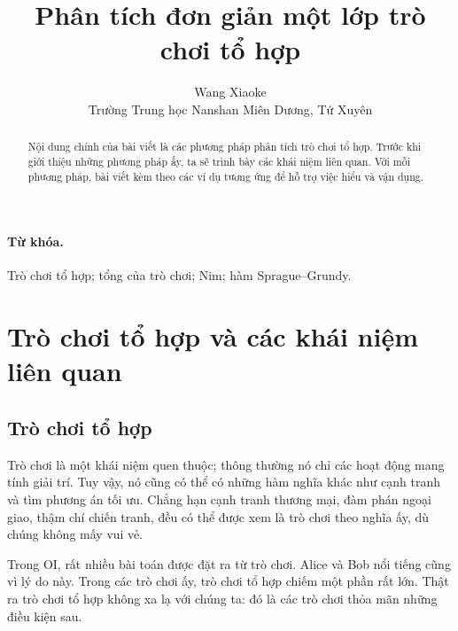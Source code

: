 \documentclass[11pt]{article}
\title{Phân tích đơn giản một lớp trò chơi tổ hợp}
\author{Wang Xiaoke\\Trường Trung học Nanshan Miên Dương, Tứ Xuyên}
\date{}
\begin{document}
\maketitle


\begin{abstract}
Nội dung chính của bài viết là các phương pháp phân tích trò chơi tổ hợp. Trước
khi giới thiệu những phương pháp ấy, ta sẽ trình bày các khái niệm liên quan.
Với mỗi phương pháp, bài viết kèm theo các ví dụ tương ứng để hỗ trợ việc hiểu
và vận dụng.
\end{abstract}

\paragraph{Từ khóa.}
Trò chơi tổ hợp; tổng của trò chơi; Nim; hàm Sprague--Grundy.

\section{Trò chơi tổ hợp và các khái niệm liên quan}

\subsection{Trò chơi tổ hợp}

Trò chơi là một khái niệm quen thuộc; thông thường nó chỉ các hoạt động mang
tính giải trí. Tuy vậy, nó cũng có thể có những hàm nghĩa khác như cạnh tranh
và tìm phương án tối ưu. Chẳng hạn cạnh tranh thương mại, đàm phán ngoại giao,
thậm chí chiến tranh, đều có thể được xem là trò chơi theo nghĩa ấy, dù chúng
không mấy vui vẻ.

Trong OI, rất nhiều bài toán được đặt ra từ trò chơi. Alice và Bob nổi tiếng
cũng vì lý do này. Trong các trò chơi ấy, trò chơi tổ hợp chiếm một phần rất
lớn. Thật ra trò chơi tổ hợp không xa lạ với chúng ta: đó là các trò chơi thỏa
mãn những điều kiện sau.
\end{document}
